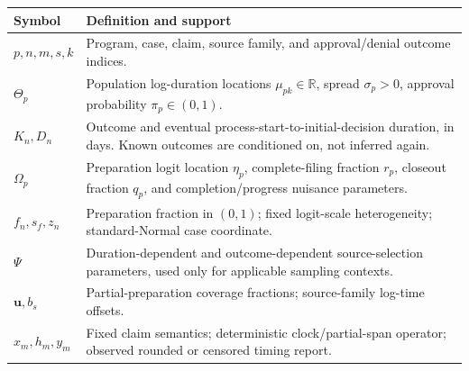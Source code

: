 \documentclass[10pt]{article}
\begin{document}
{\small
\begin{tabularx}{\linewidth}{@{}p{.22\linewidth}Y@{}}
\toprule Symbol & Definition and support \\
\midrule
$p,n,m,s,k$ & Program, case, claim, source family, and approval/denial outcome indices. \\
$\Theta_p$ & Population log-duration locations $\mu_{pk}\in\mathbb R$, spread $\sigma_p>0$, approval probability $\pi_p\in(0,1)$. \\
$K_n,D_n$ & Outcome and eventual process-start-to-initial-decision duration, in days. Known outcomes are conditioned on, not inferred again. \\
$\Omega_p$ & Preparation logit location $\eta_p$, complete-filing fraction $r_p$, closeout fraction $q_p$, and completion/progress nuisance parameters. \\
$f_n,s_f,z_n$ & Preparation fraction in $(0,1)$; fixed logit-scale heterogeneity; standard-Normal case coordinate. \\
$\Psi$ & Duration-dependent and outcome-dependent source-selection parameters, used only for applicable sampling contexts. \\
$\mathbf u,b_s$ & Partial-preparation coverage fractions; source-family log-time offsets. \\
$x_m,h_m,y_m$ & Fixed claim semantics; deterministic clock/partial-span operator; observed rounded or censored timing report. \\
\bottomrule
\end{tabularx}}

\clearpage
\end{document}
